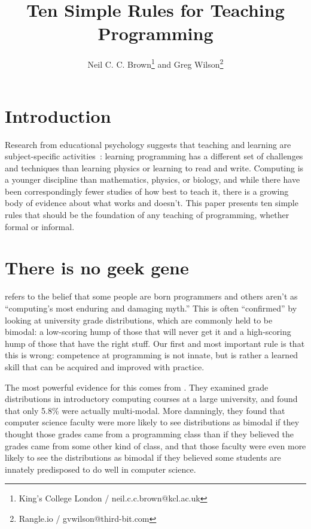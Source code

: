 \documentclass{article}
\title{Ten Simple Rules for Teaching Programming}
\author{Neil C. C. Brown\footnote{King's College London / neil.c.c.brown@kcl.ac.uk} and Greg Wilson\footnote{Rangle.io / gvwilson@third-bit.com}}
\begin{document}
\maketitle

\section*{Introduction}

Research from educational psychology suggests that teaching and learning are subject-specific
activities~\citep{mayer-subject}: learning programming has a different set of challenges and techniques
than learning physics or learning to read and write.  Computing is a younger discipline than
mathematics, physics, or biology, and while there have been correspondingly fewer studies of how best to teach it,
there is a growing body of evidence about what works and doesn't.
This paper presents ten simple rules that should be the foundation of any teaching of programming, whether
formal or informal.


\section{There is no geek gene}\label{gene}

\citet{guzdial-myths} refers to the belief that some people are born programmers and others aren't
as ``computing's most enduring and damaging myth.''
This is often ``confirmed'' by looking at university grade distributions,
which are commonly held to be bimodal:
a low-scoring hump of those that will never get it
and a high-scoring hump of those that have the right stuff.
Our first and most important rule is that this is wrong:
competence at programming is not innate,
but is rather a learned skill that can be acquired and improved with practice.

The most powerful evidence for this comes from \citet{patitsas-bimodal}.
They examined grade distributions in introductory computing courses at a large university,
and found that only 5.8\% were actually multi-modal.
More damningly,
they found that computer science faculty were more likely to see distributions as bimodal
if they thought those grades came from a programming class
than if they believed the grades came from some other kind of class,
and that those faculty were even more likely to see the distributions as bimodal
if they believed some students are innately predisposed to do well in computer science.
\end{document}
